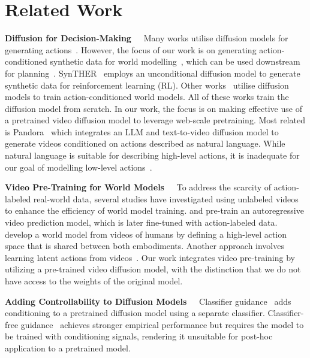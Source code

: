 \FloatBarrier

\section{Related Work}

\textbf{Diffusion for Decision-Making\ \ }
Many works utilise diffusion models for generating actions~\citep{pearce2023imitating, janner2022planning}. However, the focus of our work is on generating action-conditioned synthetic data for world modelling~\citep{ha2018world}, which can be used downstream for planning~\citep{hafner2021mastering}.
SynTHER~\citep{lu2024synthetic} employs an unconditional diffusion model to generate synthetic data for reinforcement learning (RL). Other works~\citep{alonso2024diffusion, yang2024learning, rigter2024world, hu2023gaia, zhang2024learning} utilise diffusion models to train action-conditioned world models. All of these works train the diffusion model from scratch. In our work, the focus is on making effective use of a pretrained video diffusion model to leverage web-scale pretraining. Most related is Pandora~\citep{xiang2024pandora} which integrates an LLM and text-to-video diffusion model to generate videos conditioned on actions described as natural language. While natural language is suitable for describing high-level actions, it is inadequate for our goal of modelling low-level actions~\citep{mccarthy2024towards}.

\textbf{Video Pre-Training for World Models\ \ }
To address the scarcity of action-labeled real-world data, several studies have investigated using unlabeled videos to enhance the efficiency of world model training. \citet{seo2022reinforcement} and \citet{wu2024pre} pre-train an autoregressive video prediction model, which is later fine-tuned with action-labeled data. \citet{mendonca2023structured} develop a world model from videos of humans by defining a high-level action space that is shared between both embodiments. Another approach involves learning latent actions from videos~\citep{bruce2024genie, schmidt2024learning}. Our work integrates video pre-training by utilizing a pre-trained video diffusion model, with the distinction that we do not have access to the weights of the original model.

\textbf{Adding Controllability to Diffusion Models\ \ } Classifier guidance~\citep{dhariwal2021diffusion} adds conditioning to a pretrained diffusion model using  a separate classifier. Classifier-free guidance~\citep{ho2022classifier} achieves stronger empirical performance but requires the model to be trained with conditioning signals, rendering it unsuitable for post-hoc application to a pretrained model.

